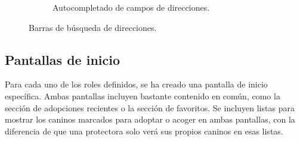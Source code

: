 \documentclass[a4paper, 12pt]{article}
\begin{document}
\begin{figure}[H]
\begin{subfigure}{0.48\textwidth}
\begin{center}
			\caption{Autocompletado de campos de direcciones.}
		\end{center}  
	\end{subfigure}\hfill
	\caption{Barras de búsqueda de direcciones.}
\end{figure}


\newpage
\subsection*{Pantallas de inicio}

Para cada uno de los roles definidos, se ha creado una pantalla de inicio específica. Ambas pantallas incluyen bastante contenido en común, como la sección de adopciones recientes o la sección de favoritos. Se incluyen listas para mostrar los caninos marcados para adoptar o acoger en ambas pantallas, con la diferencia de que una protectora solo verá sus propios caninos en esas listas. 
\end{document}
